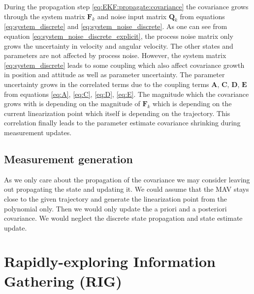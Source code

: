\documentclass[10pt,a4paper]{article}
\renewcommand{\d}[1]{\ensuremath{\operatorname{d}\!{#1}}}
\begin{document}
During the propagation step \ref{eq:EKF:propagate:covariance} the covariance grows through the system matrix $\mathbf{F}_k$ and noise input matrix $\mathbf{Q}_k$ from equations \ref{eq:system_discrete} and \ref{eq:system_noise_discrete}. As one can see from equation \ref{eq:system_noise_discrete_explicit}, the process noise matrix only grows the uncertainty in velocity and angular velocity. The other states and parameters are not affected by process noise. However, the system matrix \ref{eq:system_discrete} leads to some coupling which also affect covariance growth in position and attitude as well as parameter uncertainty. The parameter uncertainty grows in the correlated terms due to the coupling terms $\mathbf{A}$, $\mathbf{C}$, $\mathbf{D}$, $\mathbf{E}$ from equations \ref{eq:A}, \ref{eq:C}, \ref{eq:D}, \ref{eq:E}. The magnitude which the covariance grows with is depending on the magnitude of $\mathbf{F}_k$ which is depending on the current linearization point which itself is depending on the trajectory. This correlation finally leads to the parameter estimate covariance shrinking during measurement updates.

\subsection*{Measurement generation}
As we only care about the propagation of the covariance we may consider leaving out propagating the state and updating it. We could assume that the MAV stays close to the given trajectory and generate the linearization point from the polynomial only. Then we would only update the a priori and a posteriori covariance. We would neglect the discrete state propagation and state estimate update.



\section{Rapidly-exploring Information Gathering (RIG)}
\end{document}
